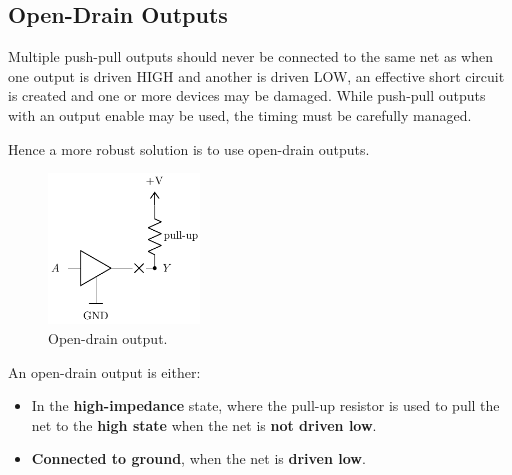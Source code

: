 \documentclass[a4paper]{report}
\begin{document}
\subsection{Open-Drain Outputs}
Multiple push-pull outputs should never be connected to the same net
as when one output is driven HIGH and another is driven LOW,
an effective short circuit is created and one or more devices may be damaged.
While push-pull outputs with an output enable may be used,
the timing must be carefully managed.

Hence a more robust solution is to use open-drain outputs.
\begin{figure}[H]
    \centering
    \includegraphics[height = 4cm, keepaspectratio = true]{figures/open_drain.pdf}
    \caption{Open-drain output.} %
\end{figure}
An open-drain output is either:
\begin{itemize}
    \item In the \textbf{high-impedance} state, where the pull-up resistor is used to pull the net to the \textbf{high state} when the net is \textbf{not driven low}.
    \item \textbf{Connected to ground}, when the net is \textbf{driven low}.
\end{itemize}
\end{document}
